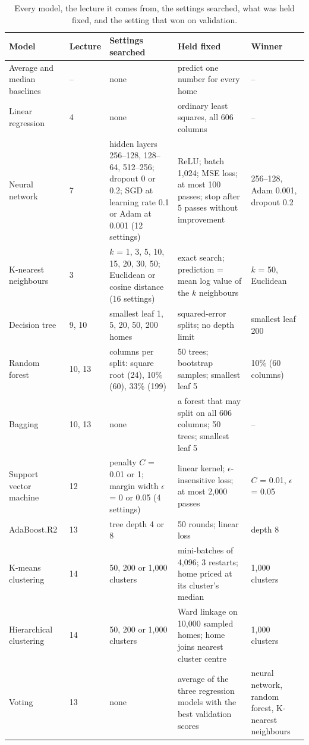 \documentclass[sigconf,nonacm,10pt]{acmart}
\begin{document}
\begin{table}[t]
\caption{Every model, the lecture it comes from, the settings searched, what was held fixed, and the setting that won on validation.}
\label{tab:grids}
\small
\renewcommand{\arraystretch}{1.15}
\begin{tabularx}{\textwidth}{@{}L{2.6cm}L{0.9cm}YYL{3.1cm}@{}}
\toprule
Model & Lecture & Settings searched & Held fixed & Winner \\
\midrule
Average and median baselines & -- & none & predict one number for every home & -- \\
Linear regression & 4 & none & ordinary least squares, all 606 columns & -- \\
Neural network & 7 & hidden layers 256--128, 128--64, 512--256; dropout 0 or 0.2; SGD at learning rate 0.1 or Adam at 0.001 (12 settings) & ReLU; batch 1,024; MSE loss; at most 100 passes; stop after 5 passes without improvement & 256--128, Adam 0.001, dropout 0.2 \\
K-nearest neighbours & 3 & $k$ = 1, 3, 5, 10, 15, 20, 30, 50; Euclidean or cosine distance (16 settings) & exact search; prediction = mean log value of the $k$ neighbours & $k$ = 50, Euclidean \\
Decision tree & 9, 10 & smallest leaf 1, 5, 20, 50, 200 homes & squared-error splits; no depth limit & smallest leaf 200 \\
Random forest & 10, 13 & columns per split: square root (24), 10\% (60), 33\% (199) & 50 trees; bootstrap samples; smallest leaf 5 & 10\% (60 columns) \\
Bagging & 10, 13 & none & a forest that may split on all 606 columns; 50 trees; smallest leaf 5 & -- \\
Support vector machine & 12 & penalty $C$ = 0.01 or 1; margin width $\epsilon$ = 0 or 0.05 (4 settings) & linear kernel; $\epsilon$-insensitive loss; at most 2,000 passes & $C$ = 0.01, $\epsilon$ = 0.05 \\
AdaBoost.R2 & 13 & tree depth 4 or 8 & 50 rounds; linear loss & depth 8 \\
K-means clustering & 14 & 50, 200 or 1,000 clusters & mini-batches of 4,096; 3 restarts; home priced at its cluster's median & 1,000 clusters \\
Hierarchical clustering & 14 & 50, 200 or 1,000 clusters & Ward linkage on 10,000 sampled homes; home joins nearest cluster centre & 1,000 clusters \\
Voting & 13 & none & average of the three regression models with the best validation scores & neural network, random forest, K-nearest neighbours \\

\end{tabularx}
\end{table}
\end{document}
